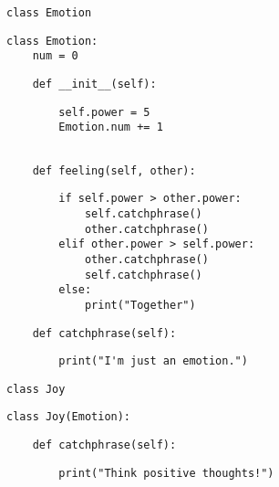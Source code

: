 \begin{blocksection}
\begin{lstlisting}
class Emotion
\end{lstlisting}

\begin{solution}[.5in]
\begin{lstlisting}
class Emotion:
    num = 0
\end{lstlisting}
\end{solution}
\begin{lstlisting}
    def __init__(self):
\end{lstlisting}
\begin{solution}[.80in]
\begin{lstlisting}
        self.power = 5
        Emotion.num += 1
\end{lstlisting}
\end{solution}
\begin{lstlisting}

    def feeling(self, other):
\end{lstlisting}
\begin{solution}[2.3in]
\begin{lstlisting}
        if self.power > other.power:
            self.catchphrase()
            other.catchphrase()
        elif other.power > self.power:
            other.catchphrase()
            self.catchphrase()
        else:
            print("Together")
\end{lstlisting}
\end{solution}
\begin{lstlisting}
    def catchphrase(self):
\end{lstlisting}
\begin{solution}[0.55in]
\begin{lstlisting}
        print("I'm just an emotion.")
\end{lstlisting}
\end{solution}

\begin{lstlisting}
class Joy
\end{lstlisting}
\begin{solution}[0in]
\begin{lstlisting}
class Joy(Emotion):
\end{lstlisting}
\end{solution}
\begin{lstlisting}
    def catchphrase(self):
\end{lstlisting}
\begin{solution}[0.55in]
\begin{lstlisting}
        print("Think positive thoughts!")
\end{lstlisting}
\end{solution}

\end{blocksection}

